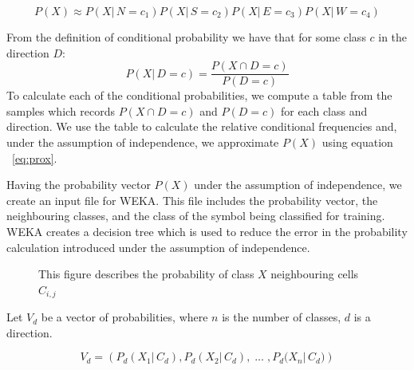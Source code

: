 \documentclass[preprint,3p,12pt]{elsarticle}
\begin{document}
\begin{equation} \label{eq:prox}
P(X) \approx P(X|\,N\!=\!c_1)P(X|\,S\!=\!c_2)P(X|\,E\!=\!c_3)P(X|\,W\!=\!c_4)
\end{equation}

From the definition of conditional probability we have that for some class $c$ in
the direction $D$:
\[ P(X|\,D\!=\!c) = \frac{P(X \cap D\!=\!c)}{P(D=c)} \]
To calculate each of the conditional probabilities,
we compute a table from the samples which records $P(X\cap D\!=\!c)$ and $P(D\!=\!c)$ for each class and direction.
We use the table to calculate the relative conditional frequencies and, under the assumption
of independence, we approximate $P(X)$ using equation ~\ref{eq:prox}.

Having the probability vector $P(X)$ under the assumption of independence, we create an input file for WEKA.
This file includes the probability vector, the neighbouring classes, and the class of the
symbol being classified for training. WEKA creates a decision tree which is used to reduce the error in the probability
calculation introduced under the assumption of independence.

\begin{figure}[h]
\begin{center}
\end{center}
\caption{This figure describes the probability of class $X$ neighbouring cells $C_{i,j}$}
\end{figure}


Let $V_{d}$ be a vector of probabilities, where $n$ is the number of classes,
$d$ is a direction.

\begin{equation}
V_{d} = \left(P_{d}{(X_{1} | \, C_{d})}, P_{d}{(X_{2} | \, C_{d}),\; \ldots \; , P_{d}{(X_{n} | \, C_{d}})}\right)
\end{equation}
\end{document}
